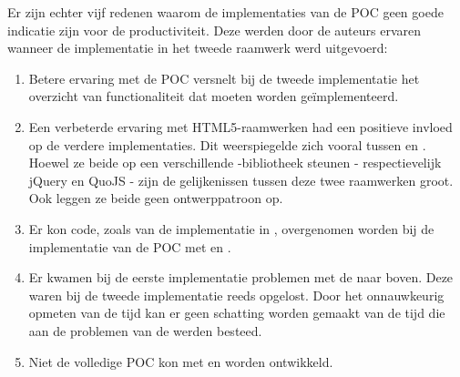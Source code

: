 % 

Er zijn echter vijf redenen waarom de implementaties van de POC geen goede indicatie zijn voor de productiviteit.
Deze werden door de auteurs ervaren wanneer de implementatie in het tweede raamwerk werd uitgevoerd:
\begin{enumerate}
\item Betere ervaring met de POC versnelt bij de tweede implementatie het overzicht van functionaliteit dat moeten worden geïmplementeerd. 
\item Een verbeterde ervaring met HTML5-raamwerken had een positieve invloed op de verdere implementaties.
Dit weerspiegelde zich vooral tussen \jqm{} en \lungo{}.
Hoewel ze beide op een verschillende \js{}-bibliotheek steunen - respectievelijk jQuery en QuoJS - zijn de gelijkenissen tussen deze twee raamwerken groot.
Ook leggen ze beide geen ontwerppatroon op.
\item Er kon code,  zoals van de implementatie in \jqm{},  overgenomen worden bij de implementatie van de POC met \lungo{} en \kendo{}.
\item Er kwamen bij de eerste implementatie problemen met de  naar boven.
Deze waren bij de tweede implementatie reeds opgelost.
Door het onnauwkeurig opmeten van de tijd kan er geen schatting worden gemaakt van de tijd die aan de problemen van de  werden besteed.
\item Niet de volledige POC kon met \lungo{} en \st{} worden ontwikkeld.
\end{enumerate}


